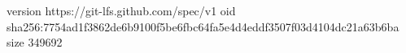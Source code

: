 version https://git-lfs.github.com/spec/v1
oid sha256:7754ad1f3862de6b9100f5be6fbc64fa5e4d4eddf3507f03d4104dc21a63b6ba
size 349692
